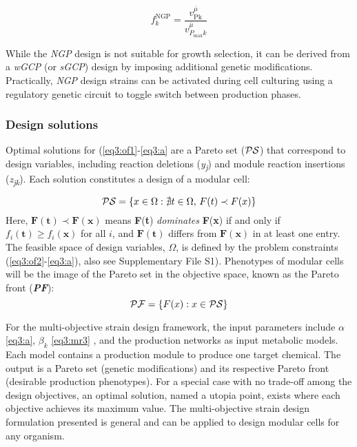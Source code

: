 \begin{equation}
    f_{k}^{\text{NGP}} = \frac{v_{\text{Pk}}^{\overline{\mu}}}{v_{P_{\max}k}^{\overline{\mu}}} \label{eq3:ngp}
\end{equation}

While the \emph{NGP} design is not suitable for growth selection, it can be derived from a \emph{wGCP} (or \emph{sGCP}) design by imposing additional genetic modifications.
Practically, \emph{NGP} design strains can be activated during cell culturing using a regulatory genetic circuit to toggle switch between production phases.

\subsubsection{Design solutions}
Optimal solutions for (\ref{eq3:of1}-\ref{eq3:a} are a Pareto set
($\mathcal{PS}$) that correspond to design variables, including
reaction deletions (\emph{y\textsubscript{j}}) and module reaction
insertions (\emph{z\textsubscript{jk}}). Each solution constitutes a
design of a modular cell:

\begin{equation}
\mathcal{PS} = \{ x \in \Omega: \nexists t \in \Omega, \, F(t) \prec F(x) \}
\end{equation}
\noindent Here, \(\mathbf{F}\left( \mathbf{t} \right)\mathbf{\prec}\mathbf{F}\left( \mathbf{x} \right)\) means \textbf{F}(\textbf{t}) \emph{dominates} \textbf{F}(\textbf{x}) if and only if \(f_{i}\left( \mathbf{t} \right) \geq f_{i}\left( \mathbf{x} \right)\) for all \(i\), and \(\mathbf{F}\left( \mathbf{t} \right)\) differs from \(\mathbf{F}\left( \mathbf{x} \right)\) in at least one entry.
The feasible space of design variables, \(\Omega\), is defined by the problem constraints (\ref{eq3:of2}-\ref{eq3:a}), also see Supplementary File S1).
Phenotypes of modular cells will be the image of the Pareto set in the objective space, known as the Pareto front (\emph{\textbf{PF}}):
\begin{equation}
    \mathcal{PF} = \{ F(x):x \in \mathcal{PS} \}
\end{equation}

For the multi-objective strain design framework, the input parameters include $\alpha$ \eqref{eq3:a}, $\beta_k$ \eqref{eq3:mr3}
, and the production networks as input metabolic models.
Each model contains a production module to produce one target chemical.
The output is a Pareto set (genetic modifications) and its respective Pareto front (desirable production phenotypes).
For a special case with no trade-off among the design objectives, an optimal solution, named a utopia point, exists where each objective achieves its maximum value.
The multi-objective strain design formulation presented is general and can be applied to design modular cells for any organism.

